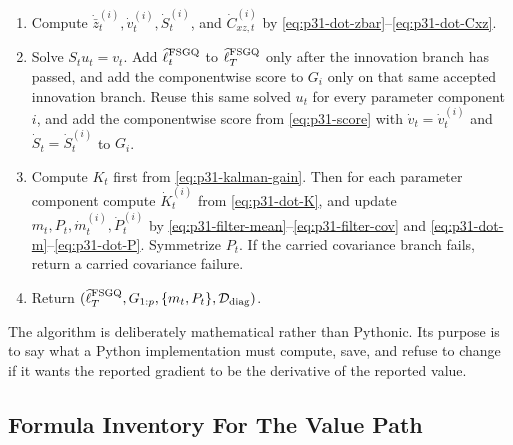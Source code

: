 \documentclass[11pt]{article}
\numberwithin{equation}{section}
\newcommand{\ellhat}{\widehat\ell}
\begin{document}
{\begin{minipage}{0.94\linewidth}
\begin{enumerate}[leftmargin=0.22in]
If \(S_t\) fails \eqref{eq:p32-failure-eigen}, return an innovation
covariance failure.
\item Compute \(\dot{\bar z}_t^{(i)},\dot v_t^{(i)},\dot S_t^{(i)}\), and
\(\dot C_{xz,t}^{(i)}\) by \eqref{eq:p31-dot-zbar}--\eqref{eq:p31-dot-Cxz}.
\item Solve \(S_tu_t=v_t\).  Add \(\ellhat_t^{\rm FSGQ}\) to
\(\ellhat_T^{\rm FSGQ}\) only after the innovation branch has passed, and add
the componentwise score to \(G_i\) only on that same accepted innovation
branch.  Reuse this same solved \(u_t\) for every parameter component \(i\),
and add the componentwise score from \eqref{eq:p31-score} with
\(\dot v_t=\dot v_t^{(i)}\) and \(\dot S_t=\dot S_t^{(i)}\) to
\(G_i\).
\item Compute \(K_t\) first from \eqref{eq:p31-kalman-gain}.  Then for each
parameter component compute \(\dot K_t^{(i)}\) from \eqref{eq:p31-dot-K},
and update \(m_t,P_t,\dot m_t^{(i)},\dot P_t^{(i)}\) by
\eqref{eq:p31-filter-mean}--\eqref{eq:p31-filter-cov} and
\eqref{eq:p31-dot-m}--\eqref{eq:p31-dot-P}.  Symmetrize \(P_t\).  If the
carried covariance branch fails, return a carried covariance failure.
\item Return \((\ellhat_T^{\rm FSGQ},G_{1:p},\{m_t,P_t\},\mathcal D_{\rm diag})\).
\end{enumerate}
\end{minipage}}

The algorithm is deliberately mathematical rather than Pythonic.  Its purpose
is to say what a Python implementation must compute, save, and refuse to
change if it wants the reported gradient to be the derivative of the reported
value.

\subsection{Formula Inventory For The Value Path}
\label{subsec:p32-value-inventory}
\end{document}
